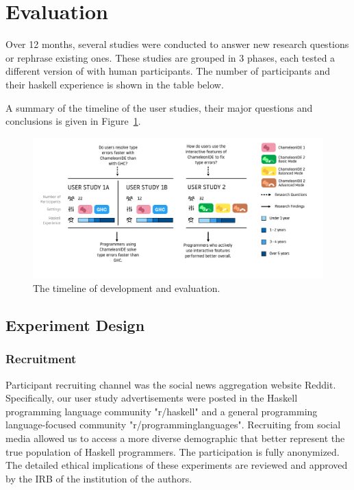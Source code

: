 \section{Evaluation}

Over 12 months, several studies were conducted to answer new research questions or rephrase existing ones. These studies are grouped in 3 phases, each tested a different version of \chameleon{} with human participants. The number of participants and their haskell experience is shown in the table below. 



A summary of the timeline of the user studies, their major questions and conclusions is given in Figure~\ref{fig:timeline}.

\begin{figure}
    \centering
    \includegraphics[width=\textwidth]{images/timeline.pdf}
    \caption{The timeline of \chameleon{}  development and 
    evaluation.}
    \label{fig:timeline}
\end{figure}

\subsection{Experiment Design}
\subsubsection*{\textbf{Recruitment}}

Participant recruiting channel was the social news aggregation website Reddit. Specifically, our user study advertisements were posted in the Haskell programming language community "r/haskell" and a general programming language-focused community "r/programminglanguages". Recruiting from social media allowed us to access a more diverse demographic that better represent the true population of Haskell programmers. The participation is fully anonymized. The detailed ethical implications of these experiments are reviewed and approved by the IRB of the institution of the authors.

